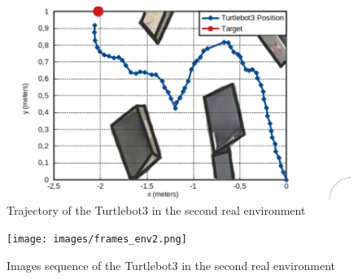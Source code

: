 \begin{figure}[H]
\centerline{\includegraphics[width=12cm]{images/env2_graph.png}}
\caption{Trajectory of the Turtlebot3 in the second real environment}
\label{fig:env2_graph}
\end{figure}

\begin{figure}[H]
\centerline{\texttt{[image: images/frames\_env2.png]}}
\caption{Images sequence of the Turtlebot3 in the second real environment}
\label{fig:frames_env2}
\end{figure}